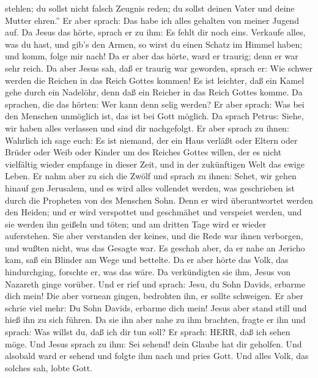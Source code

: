 stehlen; du sollst nicht falsch Zeugnis reden; du sollst deinen Vater
und deine Mutter ehren.''  Er aber sprach: Das habe ich
alles gehalten von meiner Jugend auf.  Da Jesus das hörte,
sprach er zu ihm: Es fehlt dir noch eins. Verkaufe alles, was du hast,
und gib's den Armen, so wirst du einen Schatz im Himmel haben; und komm,
folge mir nach!  Da er aber das hörte, ward er traurig;
denn er war sehr reich.  Da aber Jesus sah, daß er traurig
war geworden, sprach er: Wie schwer werden die Reichen in das Reich
Gottes kommen!  Es ist leichter, daß ein Kamel gehe durch
ein Nadelöhr, denn daß ein Reicher in das Reich Gottes komme.
 Da sprachen, die das hörten: Wer kann denn selig werden?
 Er aber sprach: Was bei den Menschen unmöglich ist, das
ist bei Gott möglich.  Da sprach Petrus: Siehe, wir haben
alles verlassen und sind dir nachgefolgt.  Er aber sprach
zu ihnen: Wahrlich ich sage euch: Es ist niemand, der ein Haus verläßt
oder Eltern oder Brüder oder Weib oder Kinder um des Reiches Gottes
willen,  der es nicht vielfältig wieder empfange in dieser
Zeit, und in der zukünftigen Welt das ewige Leben.  Er nahm
aber zu sich die Zwölf und sprach zu ihnen: Sehet, wir gehen hinauf gen
Jerusalem, und es wird alles vollendet werden, was geschrieben ist durch
die Propheten von des Menschen Sohn.  Denn er wird
überantwortet werden den Heiden; und er wird verspottet und geschmähet
und verspeiet werden,  und sie werden ihn geißeln und
töten; und am dritten Tage wird er wieder auferstehen.  Sie
aber verstanden der keines, und die Rede war ihnen verborgen, und wußten
nicht, was das Gesagte war.  Es geschah aber, da er nahe an
Jericho kam, saß ein Blinder am Wege und bettelte.  Da er
aber hörte das Volk, das hindurchging, forschte er, was das wäre.
 Da verkündigten sie ihm, Jesus von Nazareth ginge vorüber.
 Und er rief und sprach: Jesu, du Sohn Davids, erbarme dich
mein!  Die aber vornean gingen, bedrohten ihn, er sollte
schweigen. Er aber schrie viel mehr: Du Sohn Davids, erbarme dich mein!
 Jesus aber stand still und hieß ihn zu sich führen. Da sie
ihn aber nahe zu ihm brachten, fragte er ihn  und sprach:
Was willst du, daß ich dir tun soll? Er sprach: HERR, daß ich sehen
möge.  Und Jesus sprach zu ihm: Sei sehend! dein Glaube hat
dir geholfen.  Und alsobald ward er sehend und folgte ihm
nach und pries Gott. Und alles Volk, das solches sah, lobte Gott.

